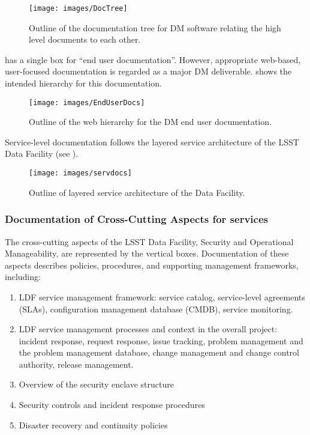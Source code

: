 \begin{figure}
\begin{center}
 \texttt{[image: images/DocTree]}
\caption{Outline of the documentation tree for DM software relating the high level documents to each other. \label{fig:doctree}}
\end{center}
\end{figure}

 has a single box for ``end user documentation''. However, appropriate web-based, user-focused documentation is regarded as a major DM deliverable.  shows the intended hierarchy for this documentation.

\begin{figure}
\begin{center}
 \texttt{[image: images/EndUserDocs]}
\caption{Outline of the web hierarchy for the DM end user documentation. \label{fig:eudoc}}
\end{center}
\end{figure}



Service-level documentation follows the layered service architecture of the LSST Data Facility (see ).

\begin{figure}
\begin{center}
 \texttt{[image: images/servdocs]}
\caption{Outline of layered service architecture of the Data Facility. \label{fig:servdoc}}
\end{center}
\end{figure}

\subsubsection {Documentation of Cross-Cutting Aspects for services}

The cross-cutting aspects of the LSST Data Facility, Security and Operational Manageability, are represented by the vertical boxes. Documentation of these aspects describes policies, procedures, and supporting management frameworks, including:
\begin{enumerate}
	\item	LDF service management framework: service catalog, service-level agreements (SLAs), configuration management database (CMDB), service monitoring.
	\item	LDF service management processes and context in the overall project: incident response, request response, issue tracking, problem management and the problem management database, change management and change control authority, release management.
	\item	Overview of the security enclave structure
	\item	Security controls and incident response procedures
	\item	Disaster recovery and continuity policies
\end{enumerate}

